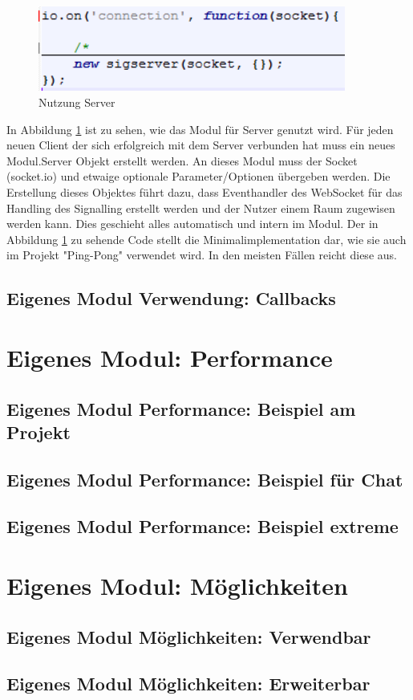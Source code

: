 \begin{figure}[ht]
\centering
\includegraphics[width=0.9\textwidth]{backend/Modul_UserServerHowTo.PNG}
\caption{Nutzung Server}
\label{backfig8}
\end{figure}
In Abbildung \ref{backfig8} ist zu sehen, wie das Modul für Server genutzt wird. Für jeden neuen Client der sich erfolgreich mit dem Server verbunden hat muss ein neues Modul.Server Objekt erstellt werden. An dieses Modul muss der Socket (socket.io) und etwaige optionale Parameter/Optionen übergeben werden. Die Erstellung dieses Objektes führt dazu, dass Eventhandler des WebSocket für das Handling des Signalling erstellt werden und der Nutzer einem Raum zugewisen werden kann. Dies geschieht alles automatisch und intern im Modul. Der in Abbildung \ref{backfig8} zu sehende Code stellt die Minimalimplementation dar, wie sie auch im Projekt "Ping-Pong" verwendet wird. In den meisten Fällen reicht diese aus.



\subsection{Eigenes Modul Verwendung: Callbacks}



\section{Eigenes Modul: Performance}

\subsection{Eigenes Modul Performance: Beispiel am Projekt}
\subsection{Eigenes Modul Performance: Beispiel für Chat}
\subsection{Eigenes Modul Performance: Beispiel extreme}



\section{Eigenes Modul: Möglichkeiten}

\subsection{Eigenes Modul Möglichkeiten: Verwendbar}
\subsection{Eigenes Modul Möglichkeiten: Erweiterbar}